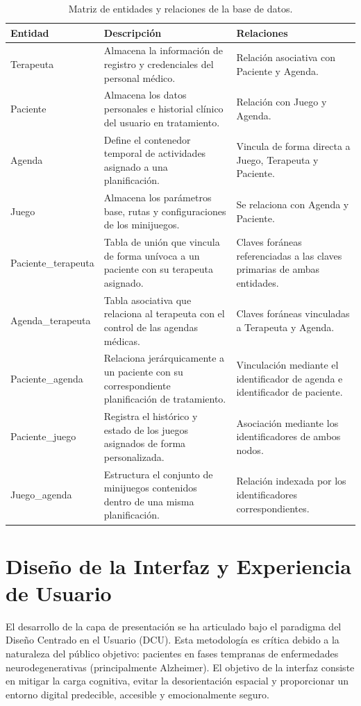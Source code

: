 \begin{table}[htbp]
\centering
\small
\caption{Matriz de entidades y relaciones de la base de datos.}
\label{tab:entidades_bd}
\begin{tabularx}{\textwidth}{|l|X|X|}
    \hline
    \textbf{Entidad} & \textbf{Descripción} & \textbf{Relaciones} \\ \hline
    Terapeuta & Almacena la información de registro y credenciales del personal médico. & Relación asociativa con Paciente y Agenda. \\ \hline
    Paciente & Almacena los datos personales e historial clínico del usuario en tratamiento. & Relación con Juego y Agenda. \\ \hline
    Agenda & Define el contenedor temporal de actividades asignado a una planificación. & Vincula de forma directa a Juego, Terapeuta y Paciente. \\ \hline
    Juego & Almacena los parámetros base, rutas y configuraciones de los minijuegos. & Se relaciona con Agenda y Paciente. \\ \hline
    Paciente\_terapeuta & Tabla de unión que vincula de forma unívoca a un paciente con su terapeuta asignado. & Claves foráneas referenciadas a las claves primarias de ambas entidades. \\ \hline
    Agenda\_terapeuta & Tabla asociativa que relaciona al terapeuta con el control de las agendas médicas. & Claves foráneas vinculadas a Terapeuta y Agenda. \\ \hline
    Paciente\_agenda & Relaciona jerárquicamente a un paciente con su correspondiente planificación de tratamiento. & Vinculación mediante el identificador de agenda e identificador de paciente. \\ \hline
    Paciente\_juego & Registra el histórico y estado de los juegos asignados de forma personalizada. & Asociación mediante los identificadores de ambos nodos. \\ \hline
    Juego\_agenda & Estructura el conjunto de minijuegos contenidos dentro de una misma planificación. & Relación indexada por los identificadores correspondientes. \\ \hline
\end{tabularx}
\end{table}


\section{Diseño de la Interfaz y Experiencia de Usuario}
El desarrollo de la capa de presentación se ha articulado bajo el paradigma del Diseño Centrado en el Usuario (DCU). Esta metodología es crítica debido a la naturaleza del público objetivo: pacientes en fases tempranas de enfermedades neurodegenerativas (principalmente Alzheimer). El objetivo de la interfaz consiste en mitigar la carga cognitiva, evitar la desorientación espacial y proporcionar un entorno digital predecible, accesible y emocionalmente seguro.

